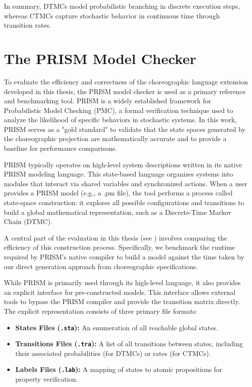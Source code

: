 In summary, DTMCs model probabilistic branching in discrete execution steps, whereas CTMCs capture stochastic behavior in continuous time through transition rates.
\section{The PRISM Model Checker}
To evaluate the efficiency and correctness of the choreographic language extension developed in this thesis, the PRISM model checker \cite{Kwiatkowska2018} is used as a primary reference and benchmarking tool. PRISM is a widely established framework for Probabilistic Model Checking (PMC), a formal verification technique used to analyze the likelihood of specific behaviors in stochastic systems. In this work, PRISM serves as a "gold standard" to validate that the state spaces generated by the choreographic projection are mathematically accurate and to provide a baseline for performance comparisons.

PRISM typically operates on high-level system descriptions written in its native PRISM modeling language. This state-based language organizes systems into modules that interact via shared variables and synchronized actions. When a user provides a PRISM model (e.g., a .pm file), the tool performs a process called state-space construction: it explores all possible configurations and transitions to build a global mathematical representation, such as a Discrete-Time Markov Chain (DTMC).

A central part of the evaluation in this thesis (see ) involves comparing the efficiency of this construction process. Specifically, we benchmark the runtime required by PRISM's native compiler to build a model against the time taken by our direct generation approach from choreographic specifications.

While PRISM is primarily used through its high-level language, it also provides an explicit interface for pre-constructed models. This interface allows external tools to bypass the PRISM compiler and provide the transition matrix directly. The explicit representation consists of three primary file formats:
\begin{itemize}
	\item \textbf{States Files (\texttt{.sta}):} An enumeration of all reachable global states.
	\item \textbf{Transitions Files (\texttt{.tra}):} A list of all transitions between states, including their associated probabilities (for DTMCs) or rates (for CTMCs).
	\item \textbf{Labels Files (\texttt{.lab}):} A mapping of states to atomic propositions for property verification.
\end{itemize}

